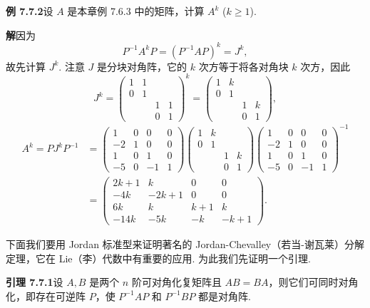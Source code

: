 \documentclass[UTF8,12pt,a4paper,fontset=fandol]{ctexart}
\begin{document}
\noindent\textbf{例 7.7.2}\quad 设 $A$ 是本章例 7.6.3 中的矩阵，计算 $A^k$ ($k\geq 1$).

\noindent\textbf{解}\quad 因为
\[
P^{-1}A^kP=(P^{-1}AP)^k=J^k,
\]
故先计算 $J^k$. 注意 $J$ 是分块对角阵，它的 $k$ 次方等于将各对角块 $k$ 次方，因此
\[
J^k=\left(\begin{array}{cccc}
1 & 1 & & \\
0 & 1 & & \\
& & 1 & 1\\
& & 0 & 1
\end{array}\right)^k
=\left(\begin{array}{cccc}
1 & k & & \\
0 & 1 & & \\
& & 1 & k\\
& & 0 & 1
\end{array}\right),
\]
\[
\begin{aligned}
A^k=PJ^kP^{-1}
&=\left(\begin{array}{cccc}
1 & 0 & 0 & 0\\
-2 & 1 & 0 & 0\\
1 & 0 & 1 & 0\\
-5 & 0 & -1 & 1
\end{array}\right)
\left(\begin{array}{cccc}
1 & k & & \\
0 & 1 & & \\
& & 1 & k\\
& & 0 & 1
\end{array}\right)
\left(\begin{array}{cccc}
1 & 0 & 0 & 0\\
-2 & 1 & 0 & 0\\
1 & 0 & 1 & 0\\
-5 & 0 & -1 & 1
\end{array}\right)^{-1}\\
&=\left(\begin{array}{cccc}
2k+1 & k & 0 & 0\\
-4k & -2k+1 & 0 & 0\\
6k & k & k+1 & k\\
-14k & -5k & -k & -k+1
\end{array}\right).
\end{aligned}
\]

下面我们要用 Jordan 标准型来证明著名的 Jordan-Chevalley（若当-谢瓦莱）分解定理，它在 Lie（李）代数中有重要的应用. 为此我们先证明一个引理.

\noindent\textbf{引理 7.7.1}\quad 设 $A,B$ 是两个 $n$ 阶可对角化复矩阵且 $AB=BA$，则它们可同时对角化，即存在可逆阵 $P$，使 $P^{-1}AP$ 和 $P^{-1}BP$ 都是对角阵.
\end{document}
